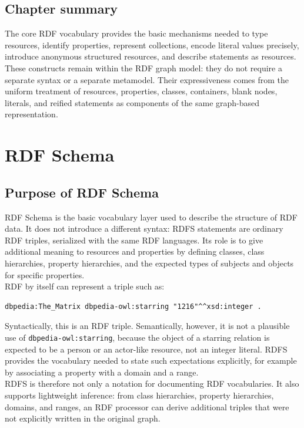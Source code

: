 \documentclass{scrbook}
\begin{document}
	\section{Chapter summary}
	
	The core RDF vocabulary provides the basic mechanisms needed to type resources, identify properties, represent collections, encode literal values precisely, introduce anonymous structured resources, and describe statements as resources. These constructs remain within the RDF graph model: they do not require a separate syntax or a separate metamodel. Their expressiveness comes from the uniform treatment of resources, properties, classes, containers, blank nodes, literals, and reified statements as components of the same graph-based representation.
	
	\chapter{RDF Schema}
	
	\section{Purpose of RDF Schema}
	
	RDF Schema is the basic vocabulary layer used to describe the structure of RDF data. It does not introduce a different syntax: RDFS statements are ordinary RDF triples, serialized with the same RDF languages. Its role is to give additional meaning to resources and properties by defining classes, class hierarchies, property hierarchies, and the expected types of subjects and objects for specific properties.\\
	
	RDF by itself can represent a triple such as:
	
	\begin{lstlisting}
dbpedia:The_Matrix dbpedia-owl:starring "1216"^^xsd:integer .
	\end{lstlisting}
	
	Syntactically, this is an RDF triple. Semantically, however, it is not a plausible use of \texttt{dbpedia-owl:starring}, because the object of a starring relation is expected to be a person or an actor-like resource, not an integer literal. RDFS provides the vocabulary needed to state such expectations explicitly, for example by associating a property with a domain and a range.\\
	
	RDFS is therefore not only a notation for documenting RDF vocabularies. It also supports lightweight inference: from class hierarchies, property hierarchies, domains, and ranges, an RDF processor can derive additional triples that were not explicitly written in the original graph.
	
\end{document}
